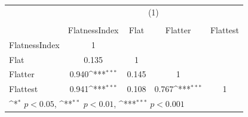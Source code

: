 {
\def\sym#1{\ifmmode^{#1}\else\(^{#1}\)\fi}
\begin{tabular}{l*{4}{c}}
\hline\hline
          &\multicolumn{4}{c}{(1)}                                                    \\
          &\multicolumn{4}{c}{}                                                       \\
          &FlatnessIndex         &     Flat         &  Flatter         & Flattest         \\
\hline
FlatnessIndex&        1         &                  &                  &                  \\
Flat      &    0.135         &        1         &                  &                  \\
Flatter   &    0.940\sym{***}&    0.145         &        1         &                  \\
Flattest  &    0.941\sym{***}&    0.108         &    0.767\sym{***}&        1         \\
\hline\hline
\multicolumn{5}{l}{\footnotesize \sym{*} \(p<0.05\), \sym{**} \(p<0.01\), \sym{***} \(p<0.001\)}\\
\end{tabular}
}
